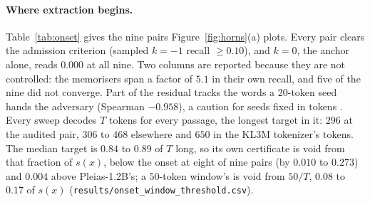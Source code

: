 \paragraph{Where extraction begins.}
Table~\ref{tab:onset} gives the nine pairs Figure~\ref{fig:horns}(a) plots. Every pair clears the admission
criterion (sampled $k=-1$ recall $\ge 0.10$), and $k=0$, the anchor alone, reads $0.000$ at all nine. Two
columns are reported because they are not controlled: the memorisers span a factor of $5.1$ in their own
recall, and five of the nine did not converge. Part of the residual tracks the words a $20$-token seed
hands the adversary (Spearman $-0.958$), a caution for seeds fixed in tokens
\citep{carlini2023quantifying}. Every sweep decodes $T$ tokens for every passage, the longest target in
it: $296$ at the audited pair, $306$ to $468$ elsewhere and $650$ in the KL3M tokenizer's tokens. The median
target is $0.84$ to $0.89$ of $T$ long, so its own certificate is void from that fraction of $s(x)$,
below the onset at eight of nine pairs (by $0.010$ to $0.273$) and $0.004$ above Pleias-1.2B's; a $50$-token window's is void from $50/T$, $0.08$ to $0.17$ of $s(x)$
(\texttt{results/\allowbreak onset\_\allowbreak window\_\allowbreak threshold.csv}).

